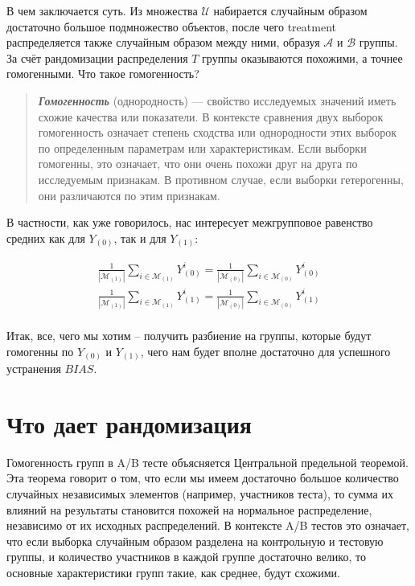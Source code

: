         В чем заключается суть.
        Из множества $\mathcal{U}$ набирается случайным образом достаточно большое подмножество объектов, после чего treatment распределяется также случайным образом между ними, образуя $\mathcal{A}$ и $\mathcal{B}$ группы.
        За счёт рандомизации распределения $T$ группы оказываются похожими, а точнее гомогенными.
        Что такое гомогенность?

        \begin{quote}
            \textbf{\textit{Гомогенность}} (однородность) --- свойство исследуемых значений иметь схожие качества или показатели.
            В контексте сравнения двух выборок гомогенность означает степень сходства или однородности этих выборок по определенным параметрам или характеристикам.
            Если выборки гомогенны, это означает, что они очень похожи друг на друга по исследуемым признакам.
            В противном случае, если выборки гетерогенны, они различаются по этим признакам.
        \end{quote}

        В частности, как уже говорилось, нас интересует межгрупповое равенство средних как для $Y_{(0)}$, так и для $Y_{(1)}$:

        \begin{gather*}
            \frac{1}{|\mathcal{M}_{(1)}|} \displaystyle\sum_{i\in\mathcal{M}_{(1)}}
            Y^i_{(0)} =
            \frac{1}{|\mathcal{M}_{(0)}|} \displaystyle\sum_{i\in\mathcal{M}_{(0)}}
            Y^i_{(0)}\\
            \frac{1}{|\mathcal{M}_{(1)}|} \displaystyle\sum_{i\in\mathcal{M}_{(1)}}
            Y^i_{(1)} =
            \frac{1}{|\mathcal{M}_{(0)}|} \displaystyle\sum_{i\in\mathcal{M}_{(0)}}
            Y^i_{(1)}\\
        \end{gather*}

        Итак, все, чего мы хотим -- получить разбиение на группы, которые будут гомогенны по $Y_{(0)}$ и $Y_{(1)}$, чего нам будет вполне достаточно для успешного устранения $BIAS$.


    \section*{Что дает рандомизация}

        Гомогенность групп в A/B тесте объясняется Центральной предельной теоремой.
        Эта теорема говорит о том, что если мы имеем достаточно большое количество случайных независимых элементов (например, участников теста), то сумма их влияний на результаты становится похожей на нормальное распределение, независимо от их исходных распределений.
        В контексте A/B тестов это означает, что если выборка случайным образом разделена на контрольную и тестовую группы, и количество участников в каждой группе достаточно велико, то основные характеристики групп такие, как среднее, будут схожими.

